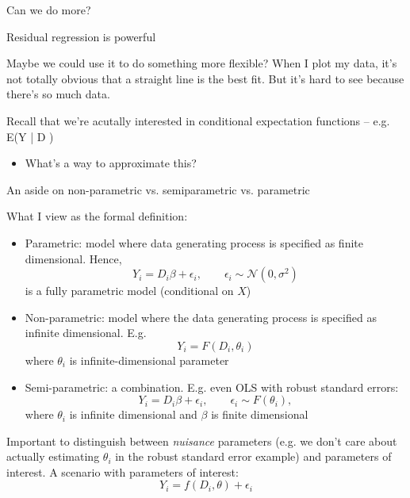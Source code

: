 \documentclass[notes,11pt, aspectratio=169]{beamer}
\newenvironment{wideitemize}{\itemize\addtolength{\itemsep}{10pt}}{\enditemize}
\begin{document}
\begin{frame}{Can we do more?}
  \begin{wideitemize}
  \item  Residual regression is powerful
  \item Maybe we could use it to do something more flexible?  When I
    plot my data, it's not totally obvious that a straight line is the
    best fit. But it's hard to see because there's so much data.
  \item   Recall that we're acutally interested in conditional expectation functions -- e.g. E(Y | D )
    \begin{itemize}
    \item   What's a way to  approximate this?
    \end{itemize}
  \end{wideitemize}
\end{frame}

\begin{frame}{An aside on non-parametric vs. semiparametric vs. parametric}
  \begin{wideitemize}
  \item What I view as the formal definition:
    \begin{itemize}
    \item Parametric: model where data generating process is specified as finite dimensional. Hence,
      $$ Y_{i} = D_{i}\beta + \epsilon_{i}, \qquad \epsilon_{i} \sim \mathcal{N}(0, \sigma^{2})$$
      is a fully parametric model (conditional on $X$)
    \item Non-parametric: model where the data generating process is specified as infinite dimensional. E.g.
      $$ Y_{i} = F(D_{i},\theta_{i})$$
      where $\theta_{i}$ is infinite-dimensional parameter
    \item Semi-parametric: a combination. E.g. even OLS with robust standard errors:
      $$ Y_{i} = D_{i}\beta + \epsilon_{i}, \qquad \epsilon_{i} \sim F(\theta_{i}),$$
      where $\theta_{i}$ is infinite dimensional and $\beta$ is finite dimensional
    \end{itemize}
  \item Important to distinguish between \emph{nuisance} parameters
    (e.g. we don't care about actually estimating $\theta_{i}$ in the
    robust standard error example) and parameters of interest. A scenario with parameters of interest:
    $$ Y_{i} = f(D_{i},\theta) + \epsilon_{i}$$
  \end{wideitemize}
\end{frame}
\end{document}

